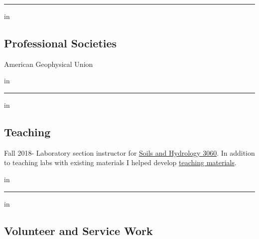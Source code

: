 \documentclass[10pt,letterpaper]{article}
\begin{document}
	\hrule
	\vspace{-0.4em}
	 in
	\subsection*{Professional Societies}
	
	American Geophysical Union
	
	 in
	
	\hrule
	\vspace{-0.4em}
	 in
	\subsection*{Teaching}
	
	Fall 2018- Laboratory section instructor for \href{http://www.hydrology.uga.edu/rasmussen/class/3060/index.html}{Soils and Hydrology 3060}. In addition to teaching labs with existing materials I helped develop \href{https://seyounger.github.io/soils_and_hydro_teaching/}{teaching materials}.
	
	 in
	
	\hrule
	\vspace{-0.4em}
	 in
	\subsection*{Volunteer and Service Work}
	
\end{document}

